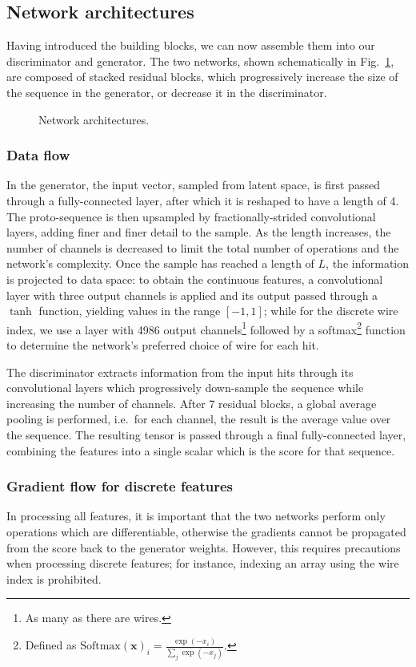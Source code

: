 \subsection{Network architectures}
Having introduced the building blocks, we can now assemble them into our discriminator and generator. The two networks, shown schematically in Fig.~\ref{fig:architectures}, are composed of stacked residual blocks, which progressively increase the size of the sequence in the generator, or decrease it in the discriminator. 

\begin{figure}
    \centering
    \caption{Network architectures.}
    \label{fig:architectures}
\end{figure}

\subsubsection{Data flow}
In the generator, the input vector, sampled from latent space, is first passed through a fully-connected layer, after which it is reshaped to have a length of 4. The proto-sequence is then upsampled by fractionally-strided convolutional layers, adding finer and finer detail to the sample. As the length increases, the number of channels is decreased to limit the total number of operations and the network's complexity. Once the sample has reached a length of $L$, the information is projected to data space: to obtain the continuous features, a convolutional layer with three output channels is applied and its output passed through a $\tanh$ function, yielding values in the range $[-1, 1]$; while for the discrete wire index, we use a layer with 4986 output channels\footnote{As many as there are wires.} followed by a softmax\footnote{Defined as $\mathrm{Softmax}(\mathbf{x})_i = \frac{\exp(-x_i)}{\sum_j \exp(-x_j)}.$} function to determine the network's preferred choice of wire for each hit.

The discriminator extracts information from the input hits through its convolutional layers which progressively down-sample the sequence while increasing the number of channels. After 7 residual blocks, a global average pooling is performed, i.e.\ for each channel, the result is the average value over the sequence. The resulting tensor is passed through a final fully-connected layer, combining the features into a single scalar which is the score for that sequence.

\subsubsection{Gradient flow for discrete features}
In processing all features, it is important that the two networks perform only operations which are differentiable, otherwise the gradients cannot be propagated from the score back to the generator weights. However, this requires precautions when processing discrete features; for instance, indexing an array using the wire index is prohibited.

